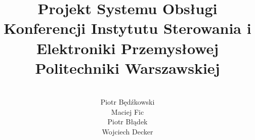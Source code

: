 \documentclass[12pt]{article}
\title{Projekt Systemu Obsługi Konferencji Instytutu Sterowania i Elektroniki Przemysłowej Politechniki Warszawskiej }
\author{\\Piotr Będźkowski\\Maciej Fic\\Piotr Błądek\\Wojciech Decker}
\begin{document}
    \renewcommand{\figurename}{Rys.}    %
    \renewcommand{\tablename}{Tab.}     %
    \thispagestyle{empty}               %
    \stronatytulowa                     %

    
    
    

    \renewcommand{\cftbeforesecskip}{8pt}
    \renewcommand{\cftsecafterpnum}{\vskip 8pt}
    \renewcommand{\cftparskip}{3pt}
    \renewcommand{\cfttoctitlefont}{\Large\bfseries\sffamily}
    \renewcommand{\cftsecfont}{\bfseries\sffamily}
    \renewcommand{\cftsubsecfont}{\sffamily}
    \renewcommand{\cftsubsubsecfont}{\sffamily}
    \renewcommand{\cftparafont}{\sffamily}



    \hypersetup{linkcolor=black}
    \renewcommand{\cftparskip}{3pt}
    \renewcommand{\cftloftitlefont}{\Large\bfseries\sffamily}
\end{document}
